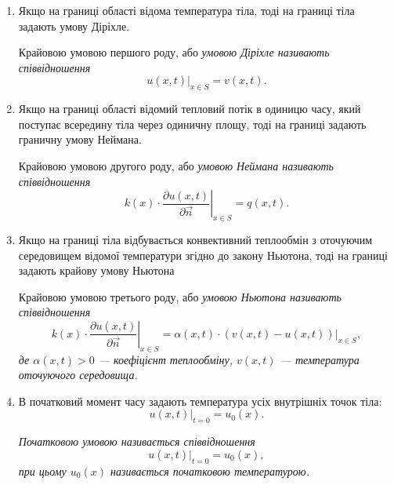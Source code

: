\begin{enumerate}
	\item Якщо на границі області відома температура тіла, тоді на границі тіла задають умову Діріхле.

	\begin{definition}
		Крайовою умовою першого роду, або \it{умовою Діріхле} називають співвідношення
		\begin{equation}
			\left. u(x, t) \right|_{x \in S} = v(x, t).		  							
		\end{equation}
	\end{definition}

	\item Якщо на границі області відомий тепловий потік в одиницю часу, який поступає всередину тіла через одиничну площу, тоді на границі задають граничну умову Неймана.

	\begin{definition}
		Крайовою умовою другого роду, або \it{умовою Неймана} називають співвідношення
		\begin{equation}
			\left. k(x) \cdot \frac{\partial u(x, t)}{\partial \vec n} \right|_{x \in S} = q(x, t).
		\end{equation}
	\end{definition}

	\item Якщо на границі тіла відбувається конвективний теплообмін з оточуючим середовищем відомої температури згідно до закону Ньютона, тоді на границі задають крайову умову Ньютона
	\begin{definition}
		Крайовою умовою третього роду, або \it{умовою Ньютона} називають співвідношення
		\begin{equation}
			\left. k(x) \cdot \frac{\partial u(x, t)}{\partial \vec n} \right|_{x \in S} = \left. \alpha(x, t) \cdot (v(x, t) - u(x, t)) \right|_{x \in S},
		\end{equation}
		де $\alpha(x, t) > 0$ --- коефіцієнт теплообміну, $v(x, t)$ --- температура оточуючого середовища.
	\end{definition}

	\item В початковий момент часу задають температура усіх внутрішніх точок тіла:
	\begin{equation}
		\left. u(x, t) \right|_{t = 0} = u_0(x).
	\end{equation}

	\begin{definition}
		\it{Початковою умовою} називається співвідношення
		\begin{equation}
			\left. u(x, t) \right|_{t = 0} = u_0(x),
		\end{equation}
		при цьому $u_0(x)$ називається \it{початковою температурою}.
	\end{definition}
\end{enumerate}

